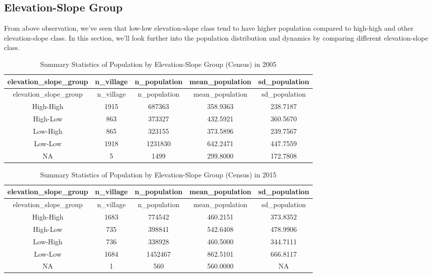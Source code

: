 \documentclass[
  letterpaper,
  DIV=11,
  numbers=noendperiod]{scrartcl}
\begin{document}
\subsection{Elevation-Slope Group}\label{elevation-slope-group}

From above observation, we've seen that low-low elevation-slope class
tend to have higher population compared to high-high and other
elevation-slope class. In this section, we'll look further into the
population distribution and dynamics by comparing different
elevation-slope class.

\begin{longtable}[]{@{}ccccc@{}}
\caption{Summary Statistics of Population by Elevation-Slope Group
(Census) in 2005}\tabularnewline
\toprule\noalign{}
elevation\_slope\_group & n\_village & n\_population & mean\_population
& sd\_population \\
\midrule\noalign{}
\endfirsthead
\toprule\noalign{}
elevation\_slope\_group & n\_village & n\_population & mean\_population
& sd\_population \\
\midrule\noalign{}
\endhead
\bottomrule\noalign{}
\endlastfoot
High-High & 1915 & 687363 & 358.9363 & 238.7187 \\
High-Low & 863 & 373327 & 432.5921 & 360.5670 \\
Low-High & 865 & 323155 & 373.5896 & 239.7567 \\
Low-Low & 1918 & 1231830 & 642.2471 & 447.7559 \\
NA & 5 & 1499 & 299.8000 & 172.7808 \\
\end{longtable}

\begin{longtable}[]{@{}ccccc@{}}
\caption{Summary Statistics of Population by Elevation-Slope Group
(Census) in 2015}\tabularnewline
\toprule\noalign{}
elevation\_slope\_group & n\_village & n\_population & mean\_population
& sd\_population \\
\midrule\noalign{}
\endfirsthead
\toprule\noalign{}
elevation\_slope\_group & n\_village & n\_population & mean\_population
& sd\_population \\
\midrule\noalign{}
\endhead
\bottomrule\noalign{}
\endlastfoot
High-High & 1683 & 774542 & 460.2151 & 373.8352 \\
High-Low & 735 & 398841 & 542.6408 & 478.9906 \\
Low-High & 736 & 338928 & 460.5000 & 344.7111 \\
Low-Low & 1684 & 1452467 & 862.5101 & 666.8117 \\
NA & 1 & 560 & 560.0000 & NA \\
\end{longtable}
\end{document}
